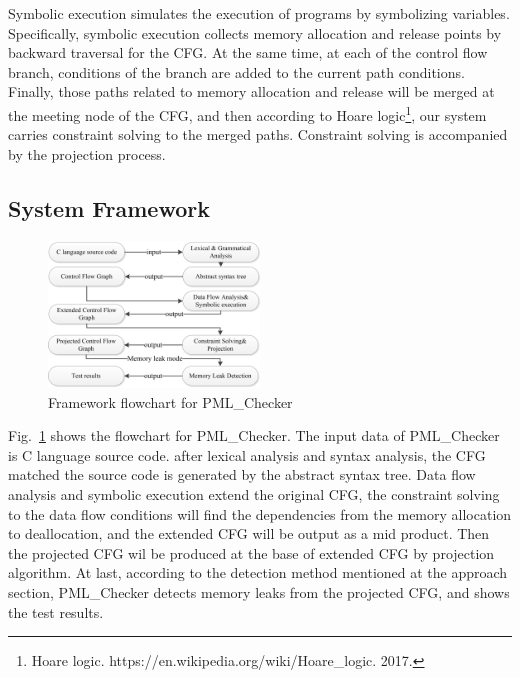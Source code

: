 Symbolic execution simulates the execution of programs by symbolizing variables. Specifically, symbolic execution collects memory allocation and release points by backward traversal for the CFG. At the same time, at each of the control flow branch, conditions of the branch are added to the current path conditions. Finally, those paths related to memory allocation and release will be merged at the meeting node of the CFG, and then according to Hoare logic\footnote{Hoare logic. https://en.wikipedia.org/wiki/Hoare\_logic. 2017.}, our system carries constraint solving to the merged paths. Constraint solving is accompanied by the projection process.  

\subsection{System Framework}

\begin{figure}[!h]
\small
\centering
\includegraphics[width=0.5\textwidth]{figure/fig8-fig12/fig_new}
\caption{Framework flowchart for PML\_Checker}\label{fig:18}
\end{figure}

Fig.~\ref{fig:18} shows the flowchart for PML\_Checker. The input data of PML\_Checker is C language source code. after lexical analysis and syntax analysis, the CFG matched the source code is generated by the abstract syntax tree. Data flow analysis and symbolic execution extend the original CFG, the constraint solving to the data flow conditions will find the dependencies from the memory allocation to deallocation, and the extended CFG will be output as a mid product. Then the projected CFG wil be produced at the base of extended CFG by projection algorithm. At last, according to the detection method mentioned at the approach section, PML\_Checker detects memory leaks from the projected CFG, and shows the test results. 

